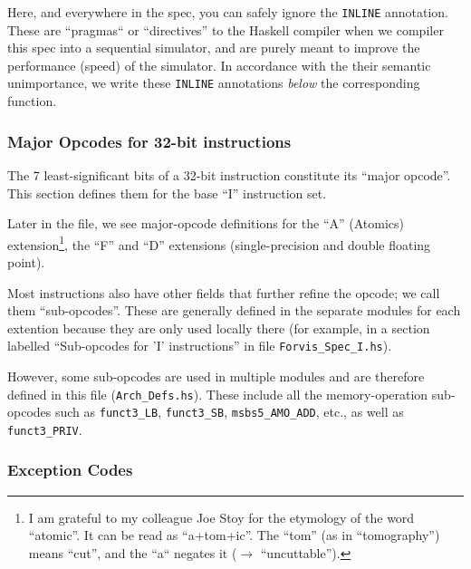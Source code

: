\documentclass[11pt]{article}
\begin{document}


Here, and everywhere in the spec, you can safely ignore the
\verb|INLINE| annotation.  These are ``pragmas`` or ``directives'' to
the Haskell compiler when we compiler this spec into a sequential
simulator, and are purely meant to improve the performance (speed) of
the simulator.  In accordance with the their semantic unimportance, we
write these \verb|INLINE| annotations \emph{below} the corresponding
function.


\subsubsection{Major Opcodes for 32-bit instructions}

The 7 least-significant bits of a 32-bit instruction constitute its
``major opcode''.  This section defines them for the base ``I''
instruction set.



Later in the file, we see major-opcode definitions for the ``A''
(Atomics) extension\footnote{I am grateful to my colleague Joe Stoy
for the etymology of the word ``atomic''.  It can be read as
``a+tom+ic''.  The ``tom'' (as in ``tomography'') means ``cut'', and
the ``a`` negates it ($\rightarrow$ ``uncuttable'').}, the ``F'' and
``D'' extensions (single-precision and double floating point).

Most instructions also have other fields that further refine the
opcode; we call them ``sub-opcodes''.  These are generally defined in
the separate modules for each extention because they are only used
locally there (for example, in a section labelled ``Sub-opcodes for
'I' instructions'' in file \verb|Forvis_Spec_I.hs|).

However, some sub-opcodes are used in multiple modules and are
therefore defined in this file (\verb|Arch_Defs.hs|).  These include
all the memory-operation sub-opcodes such as \verb|funct3_LB|,
\verb|funct3_SB|, \verb|msbs5_AMO_ADD|, etc., as well as
\verb|funct3_PRIV|.


\subsubsection{Exception Codes}
\end{document}
